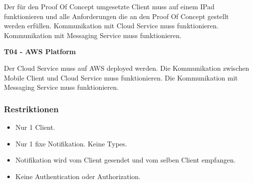Der für den Proof Of Concept umgesetzte Client muss auf einem IPad funktionieren und alle Anforderungen die an den
Proof Of Concept gestellt werden erfüllen. Kommunikation mit Cloud Service muss funktionieren. Kommunikation mit Messaging Service muss funktionieren.


\textbf{T04 - AWS Platform}

Der Cloud Service muss auf AWS deployed werden. Die Kommunikation zwischen Mobile Client und Cloud Service muss funktionieren.
Die Kommunikation mit Messaging Service muss funktionieren.



\subsubsection*{Restriktionen}
\begin{itemize}
    \item Nur 1 Client.
    \item Nur 1 fixe Notifikation. Keine Types.
    \item Notifikation wird vom Client gesendet und vom selben Client empfangen.
    \item Keine Authentication oder Authorization.
\end{itemize}

\clearpage
